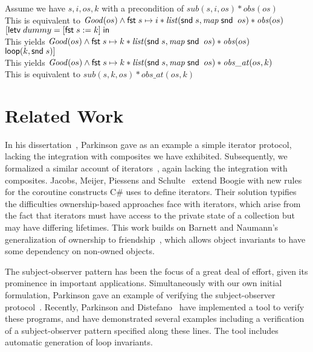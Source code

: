 \begin{tabbedproof}
\oo Assume we have $s, i, os, k$ with a precondition of $\mathit{sub}(s, i, os) * \mathit{obs}(os)$ \\
\oo This is equivalent to $\mathit{Good}(os) \land \mathsf{fst}\; s\mapsto i * \mathit{list}(\mathsf{snd}\; s, \mathit{map}\;\mathsf{snd}\;\;os) * \mathit{obs}(os)$ \\
\oo $[\mathsf{letv}\;dummy = [\mathsf{fst}\; s := k]\;\mathsf{in}\;$ \\
\oo This yields $\mathit{Good}(os) \land \mathsf{fst}\; s\mapsto k * \mathit{list}(\mathsf{snd}\; s, \mathit{map}\;\mathsf{snd}\;\;os) * \mathit{obs}(os)$ \\
\oo $\mathsf{loop}(k, \mathsf{snd}\; s)]$ \\
\oo This yields $\mathit{Good}(os) \land \mathsf{fst}\; s\mapsto k * \mathit{list}(\mathsf{snd}\; s, \mathit{map}\;\mathsf{snd}\;\;os) * \mathit{obs\_at}(os, k)$ \\
\oo This is equivalent to $\mathit{sub}(s, k, os) * \mathit{obs\_at}(os,k)$ 
\end{tabbedproof}

% 

\section{Related Work}

In his dissertation~\cite{parkinson-thesis}, Parkinson gave as an
example a simple iterator protocol, lacking the integration with
composites we have exhibited.  Subsequently, we formalized a similar
account of iterators~\cite{iterator}, again lacking the integration
with composites. Jacobs, Meijer, Piessens and
Schulte~\cite{iterators-revisited} extend Boogie with new rules for
the coroutine constructs C\# uses to define iterators. Their solution
typifies the difficulties ownership-based approaches face with
iterators, which arise from the fact that iterators must have access
to the private state of a collection but may have differing
lifetimes. This work builds on Barnett and Naumann's generalization of
ownership to friendship~\cite{friends}, which allows object invariants
to have some dependency on non-owned objects.

The subject-observer pattern has been the focus of a great deal of effort,
given its prominence in important applications. Simultaneously with our own
initial formulation, Parkinson gave an example of verifying the
subject-observer protocol~\cite{parkinson-iwaco-07}. Recently, Parkinson and
Distefano~\cite{jstar-parkinson-distefano} have implemented a tool to verify
these programs, and have demonstrated several examples including a verification
of a subject-observer pattern specified along these lines. The tool includes
automatic generation of loop invariants. 

